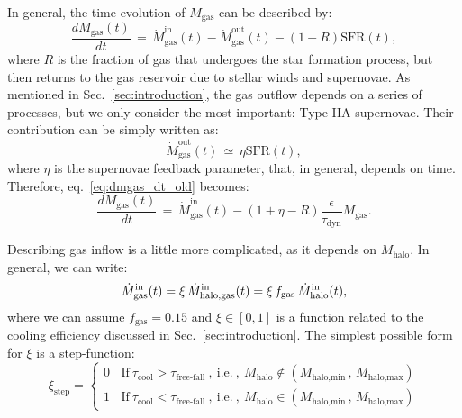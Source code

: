 \documentclass[fleqn,usenatbib]{mnras}
\begin{document}
In general, the time evolution of $M_\text{gas}$ can be described by:
\begin{equation}
    \dfrac{dM_\text{gas}(t)}{dt} \, = \, \dot{M}_\text{gas}^\text{in}(t) - \dot{M}_\text{gas}^\text{out}(t) - \left(1-R\right)\text{SFR}(t),
	\label{eq:dmgas_dt_old}
\end{equation}
where $R$ is the fraction of gas that undergoes the star formation process, but then returns to the gas reservoir due to stellar winds and supernovae.
As mentioned in Sec.~\ref{sec:introduction}, the gas outflow depends on a series of processes, but we only consider the most important: Type IIA supernovae. Their contribution can be simply written as:
\begin{equation}
    \dot{M}_\text{gas}^\text{out}(t) \, \simeq \, \eta\text{SFR}(t),
	\label{eq:mgas_outflow}
\end{equation}
where $\eta$ is the supernovae feedback parameter, that, in general, depends on time. Therefore, eq.~\ref{eq:dmgas_dt_old} becomes:
\begin{equation}
    \dfrac{dM_\text{gas}(t)}{dt} \, = \, \dot{M}_\text{gas}^\text{in}(t) - \left(1+\eta-R\right) \dfrac{\epsilon}{\tau_\text{dyn}} M_\text{gas}.
	\label{eq:dmgas_dt}
\end{equation}

Describing gas inflow is a little more complicated, as it depends on $M_\text{halo}$. In general, we can write:
\begin{equation}
    \dot{M}_\text{gas}^\text{in}(t) = \xi \, \dot{M}_\text{halo,\rm gas}^\text{in}(t) = \xi \, f_\text{gas} \, \dot{M}_\text{halo}^\text{in}(t),
	\label{eq:mgas_inflow}
\end{equation}
where we can assume $f_\text{gas}=0.15$ and $\xi \in [0,1]$ is a function related to the cooling efficiency discussed in Sec.~\ref{sec:introduction}. The simplest possible form for $\xi$ is a step-function:
{\fontsize{7.9pt}{7.9pt}\begin{equation}
    \xi_\text{step} =
    \begin{cases}
        0 \:\:\:\: \text{If} \: \tau_\text{cool} > \tau_\text{free-fall} \: , \: \text{i.e.} \: , \: M_{\text{halo}} \notin \left( M_{\text{halo,min}} \, , \, M_{\text{halo,max}} \right)\\
        1 \:\:\:\: \text{If} \: \tau_\text{cool} < \tau_\text{free-fall} \: , \: \text{i.e.} \: , \: M_{\text{halo}} \in \left( M_{\text{halo,min}} \, , \, M_{\text{halo,max}} \right)
    \end{cases}
	\label{eq:xi_step}
\end{equation}}
\end{document}
